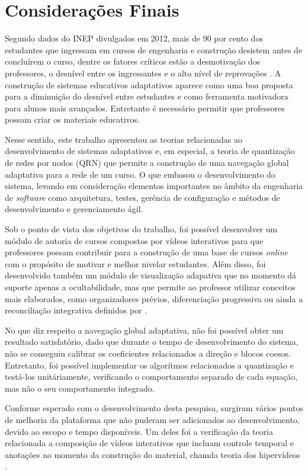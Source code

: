 \chapter[Considerações Finais]{Considerações Finais}

Segundo dados do INEP divulgados em 2012, mais de 90 por cento dos estudantes que ingressam em cursos de engenharia e construção desistem antes de concluírem o curso, dentre os fatores críticos estão a desmotivação dos professores, o desnível entre os ingressantes e o alto nível de reprovações \cite{silva2005}. A construção de sistemas educativos adaptativos aparece como uma boa proposta para a diminuição do desnível entre estudantes e como ferramenta motivadora para alunos mais avançados. Entretanto é necessário permitir que professores possam criar os materiais educativos.

Nesse sentido, este trabalho apresentou as teorias relacionadas ao desenvolvimento de sistemas adaptativos e, em especial, a teoria de quantização de redes por nodos (QRN) que permite a construção de uma navegação global adaptativa para a rede de um curso. O que embasou o desenvolvimento do sistema, levando em consideração elementos importantes no âmbito da engenharia de \textit{software} como arquitetura, testes, gerência de configuração e métodos de desenvolvimento e gerenciamento ágil. 

Sob o ponto de vista dos objetivos do trabalho, foi possível desenvolver um módulo de autoria de cursos compostos por vídeos interativos para que professores possam contribuir para a construção de uma base de cursos \textit{online} com o propósito de motivar e melhor nivelar estudantes. Além disso, foi desenvolvido também um módulo de visualização adapativa que no momento dá suporte apenas a ocultabilidade, mas que permite ao professor utilizar conceitos mais elaborados, como organizadores prévios, diferenciação progressiva ou ainda a reconciliação integrativa definidos por .

No que diz respeito a navegação global adaptativa, não foi possível obter um resultado satisfatório, dado que durante o tempo de desenvolvimento do sistema, não se conseguiu calibrar os coeficientes relacionados a direção e blocos coesos. Entretanto, foi possível implementar os algorítmos relacionados a quantização e testá-los unitáriamente, verificando o comportamento separado de cada equação, mas não o seu comportamento integrado. 

Conforme esperado com o desenvolvimento desta pesquisa, surgiram vários pontos de melhoria da plataforma que não puderam ser adicionados ao desenvolvimento, devido ao escopo e tempo disponíveis. Um deles foi a verificação da teoria relacionada a composição de vídeos interativos que incluam controle temporal e anotações no momento da construção do material, chamda teoria dos hipervídeos \cite{Sadallah2012}. 

